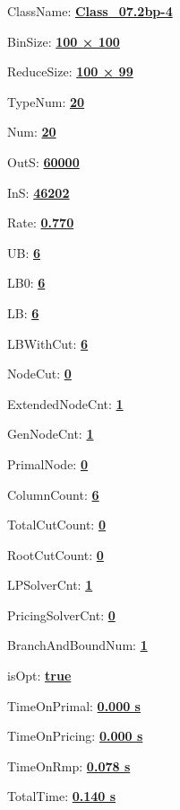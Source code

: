 \documentclass[11pt]{article}
\begin{document}
\pagestyle{empty}


ClassName: \underline{\textbf{Class_07.2bp-4}}
\par
BinSize: \underline{\textbf{100 × 100}}
\par
ReduceSize: \underline{\textbf{100 × 99}}
\par
TypeNum: \underline{\textbf{20}}
\par
Num: \underline{\textbf{20}}
\par
OutS: \underline{\textbf{60000}}
\par
InS: \underline{\textbf{46202}}
\par
Rate: \underline{\textbf{0.770}}
\par
UB: \underline{\textbf{6}}
\par
LB0: \underline{\textbf{6}}
\par
LB: \underline{\textbf{6}}
\par
LBWithCut: \underline{\textbf{6}}
\par
NodeCut: \underline{\textbf{0}}
\par
ExtendedNodeCnt: \underline{\textbf{1}}
\par
GenNodeCnt: \underline{\textbf{1}}
\par
PrimalNode: \underline{\textbf{0}}
\par
ColumnCount: \underline{\textbf{6}}
\par
TotalCutCount: \underline{\textbf{0}}
\par
RootCutCount: \underline{\textbf{0}}
\par
LPSolverCnt: \underline{\textbf{1}}
\par
PricingSolverCnt: \underline{\textbf{0}}
\par
BranchAndBoundNum: \underline{\textbf{1}}
\par
isOpt: \underline{\textbf{true}}
\par
TimeOnPrimal: \underline{\textbf{0.000 s}}
\par
TimeOnPricing: \underline{\textbf{0.000 s}}
\par
TimeOnRmp: \underline{\textbf{0.078 s}}
\par
TotalTime: \underline{\textbf{0.140 s}}
\par
\newpage


\end{document}
